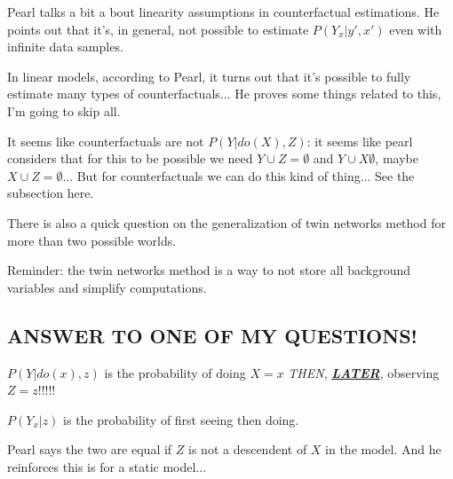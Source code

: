 Pearl talks a bit a bout linearity assumptions in counterfactual estimations. He points out that it's, in general, not possible to estimate $P(Y_{x}|y',x')$ even with infinite data samples.

In linear models, according to Pearl, it turns out that it's possible to fully estimate many types of counterfactuals... He proves some things related to this, I'm going to skip all.

It seems like counterfactuals are not $P(Y|do(X),Z)$: it seems like pearl considers that for this to be possible we need $Y\cup Z = \emptyset$ and $Y \cup X  \emptyset$, maybe $X\cup Z = \emptyset$... But for counterfactuals we can do this kind of thing... See the subsection here.

There is also a quick question on the generalization of twin networks method for more than two possible worlds.

Reminder: the twin networks method is a way to not store all background variables and simplify computations.

\subsection{\textbf{ANSWER TO ONE OF MY QUESTIONS!}}

$P(Y|do(x),z)$ is the probability of doing $X=x$ \textit{THEN}, \underline{\textit{\textbf{LATER}}}, observing $Z=z$!!!!!

$P(Y_x|z)$ is the probability of first seeing then doing.

Pearl says the two are equal if $Z$ is not a descendent of $X$ in the model. And he reinforces this is for a static model...

